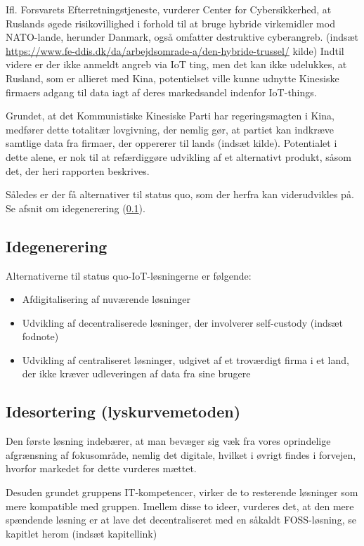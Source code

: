 \documentclass[11pt]{article}
\begin{document}
Ifl. Forsvarets Efterretningstjeneste, vurderer Center for Cybersikkerhed, at Ruslands øgede risikovillighed i forhold til at bruge hybride virkemidler mod NATO-lande, herunder Danmark, også omfatter destruktive cyberangreb. (indsæt \url{https://www.fe-ddis.dk/da/arbejdsomrade-a/den-hybride-trussel/} kilde) Indtil videre er der ikke anmeldt angreb via IoT ting, men det kan ikke udelukkes, at Rusland, som er allieret med Kina, potentielset ville kunne udnytte Kinesiske firmaers adgang til data iagt af deres markedsandel indenfor IoT-things.

Grundet, at det Kommunistiske Kinesiske Parti har regeringsmagten i Kina, medfører dette totalitær lovgivning, der nemlig gør, at partiet kan indkræve samtlige data fra firmaer, der oppererer til lands (indsæt kilde). Potentialet i dette alene, er nok til at refærdiggøre udvikling af et alternativt produkt, såsom det, der heri rapporten beskrives.

Således er der få alternativer til status quo, som der herfra kan viderudvikles på. Se afsnit om idegenerering (\ref{sec:org3ff37e5}).
\subsection{Idegenerering}
\label{sec:org3ff37e5}
Alternativerne til status quo-IoT-løsningerne er følgende:
\begin{itemize}
\item Afdigitalisering af nuværende løsninger
\item Udvikling af decentraliserede løsninger, der involverer self-custody (indsæt fodnote)
\item Udvikling af centraliseret løsninger, udgivet af et troværdigt firma i et land, der ikke kræver udleveringen af data fra sine brugere
\end{itemize}
\subsection{Idesortering (lyskurvemetoden)}
\label{sec:org605086d}
Den første løsning indebærer, at man bevæger sig væk fra vores oprindelige afgrænsning af fokusområde, nemlig det digitale, hvilket i øvrigt findes i forvejen, hvorfor markedet for dette vurderes mættet.

Desuden grundet gruppens IT-kompetencer, virker de to resterende løsninger som mere kompatible med gruppen. Imellem disse to ideer, vurderes det, at den mere spændende løsning er at lave det decentraliseret med en såkaldt FOSS-løsning, se kapitlet herom (indsæt kapitellink)
\end{document}
